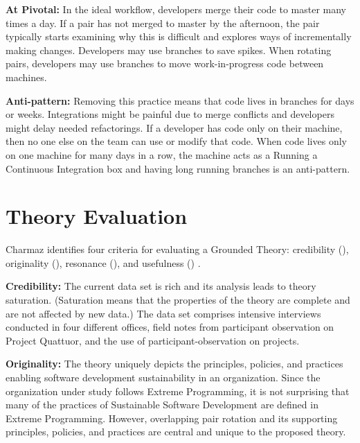 \textbf{At Pivotal:} In the ideal workflow, developers merge their code to master many times a day. If a pair has not merged to master by the afternoon, the pair typically starts examining why this is difficult and explores ways of incrementally making changes. Developers may use branches to save spikes. When rotating pairs, developers may use branches to move work-in-progress code between machines. 

\textbf{Anti-pattern:} Removing this practice means that code lives in branches for days or weeks. Integrations might be painful due to merge conflicts and developers might delay needed refactorings. If a developer has code only on their machine, then no one else on the team can use or modify that code. When code lives only on one machine for many days in a row, the machine acts as a  Running a Continuous Integration box and having long running branches is an anti-pattern.
\section{Theory Evaluation}
\label{TheoryEvaluation}

Charmaz identifies four criteria for evaluating a Grounded Theory: credibility (), originality (), resonance (), and usefulness () \cite{StolGroundedTheory}. 

\textbf{Credibility:} The current data set is rich and its analysis leads to theory saturation. (Saturation means that the properties of the theory are complete and are not affected by new data.) The data set comprises \numberOfInterviews{} intensive interviews conducted in four different offices, field notes from participant observation on Project Quattuor, and the use of participant-observation on \numberOfObservedProjects{} projects.

\textbf{Originality:} The theory uniquely depicts the principles, policies, and practices enabling software development sustainability in an organization. Since the organization under study follows Extreme Programming, it is not surprising that many of the practices of Sustainable Software Development are defined in Extreme Programming. However, overlapping pair rotation and its supporting principles, policies, and practices are central and unique to the proposed theory.

